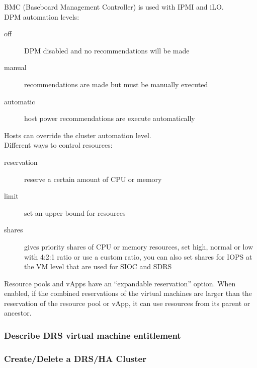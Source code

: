 BMC (Baseboard Management Controller) is used with IPMI and iLO.\\

DPM automation levels:

\begin{description}

\item[off]
DPM disabled and no recommendations will be made

\item[manual]
recommendations are made but must be manually executed

\item[automatic]
host power recommendations are execute automatically

\end{description}

Hosts can override the cluster automation level.\\

Different ways to control resources:

\begin{description}

\item[reservation]
reserve a certain amount of CPU or memory

\item[limit]
set an upper bound for resources

\item[shares]
gives priority shares of CPU or memory resources, set high, normal or low
with 4:2:1 ratio or use a custom ratio, you can also set shares for IOPS
at the VM level that are used for SIOC and SDRS

\end{description}

Resource pools and vApps have an ``expandable reservation'' option. When
enabled, if the combined reservations of the virtual machines are larger
than the reservation of the resource pool or vApp, it can use resources from
its parent or ancestor.

\subsubsection{Describe DRS virtual machine entitlement}

\subsubsection{Create/Delete a DRS/HA Cluster}

